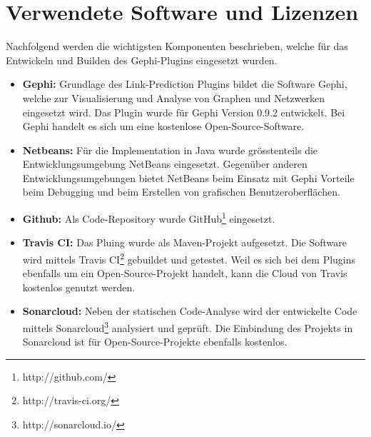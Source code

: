 \section{Verwendete Software und Lizenzen}

Nachfolgend werden die wichtigsten Komponenten beschrieben, welche für das Entwickeln und Builden des Gephi-Plugins eingesetzt wurden.

\begin{itemize}
    \item \textbf{Gephi:} Grundlage des Link-Prediction Plugins bildet die Software Gephi, welche zur Visualisierung und Analyse von Graphen und Netzwerken eingesetzt wird. Das Plugin wurde für Gephi Version 0.9.2 entwickelt. Bei Gephi handelt es sich um eine kostenlose Open-Source-Software. %
    \item \textbf{Netbeans:} Für die Implementation in Java wurde grösstenteils die Entwicklungsumgebung NetBeans eingesetzt. Gegenüber anderen Entwicklungsumgebungen bietet NetBeans beim Einsatz mit Gephi Vorteile beim Debugging und beim Erstellen von grafischen Benutzeroberflächen.
    \item \textbf{Github:} Als Code-Repository wurde GitHub\footnote{http://github.com/} eingesetzt.
    \item \textbf{Travis CI:} Das Pluing wurde als Maven-Projekt aufgesetzt. Die Software wird mittels Travis CI\footnote{http://travis-ci.org/} gebuildet und getestet. Weil es sich bei dem Plugins ebenfalls um ein Open-Source-Projekt handelt, kann die Cloud von Travis kostenlos genutzt werden.
    \item \textbf{Sonarcloud:} Neben der statischen Code-Analyse wird der entwickelte Code mittels Sonarcloud\footnote{http://sonarcloud.io/} analysiert und geprüft. Die Einbindung des Projekts in Sonarcloud ist für Open-Source-Projekte ebenfalls kostenlos.
\end{itemize}
